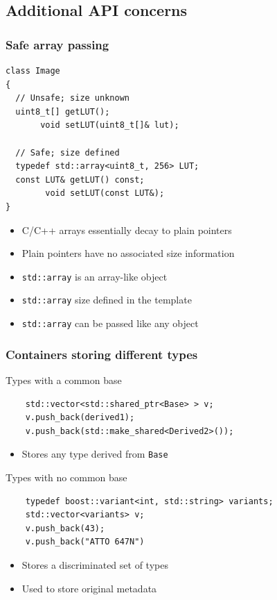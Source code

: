 \documentclass{beamer}
\begin{document}
\subsection{Additional API concerns}

\begin{frame}[fragile]
  \frametitle{Safe array passing}
  \begin{lstlisting}
class Image
{
  // Unsafe; size unknown
  uint8_t[] getLUT();
       void setLUT(uint8_t[]& lut);

  // Safe; size defined
  typedef std::array<uint8_t, 256> LUT;
  const LUT& getLUT() const;
        void setLUT(const LUT&);
}
\end{lstlisting}
  \begin{itemize}
  \item C/C++ arrays essentially decay to plain pointers
  \item Plain pointers have no associated size information
  \item \texttt{std::array} is an array-like object
  \item \texttt{std::array} size defined in the template
  \item \texttt{std::array} can be passed like any object
  \end{itemize}
\end{frame}

\begin{frame}[fragile]
  \frametitle{Containers storing different types}
\begin{block}{Types with a common base}
  \begin{lstlisting}
    std::vector<std::shared_ptr<Base> > v;
    v.push_back(derived1);
    v.push_back(std::make_shared<Derived2>());
\end{lstlisting}
  \begin{itemize}
  \item Stores any type derived from \texttt{Base}
  \end{itemize}
\end{block}
\begin{block}{Types with no common base}
  \begin{lstlisting}
    typedef boost::variant<int, std::string> variants;
    std::vector<variants> v;
    v.push_back(43);
    v.push_back("ATTO 647N")
\end{lstlisting}
  \begin{itemize}
  \item Stores a discriminated set of types
  \item Used to store original metadata
  \end{itemize}
\end{block}
\end{frame}
\end{document}
